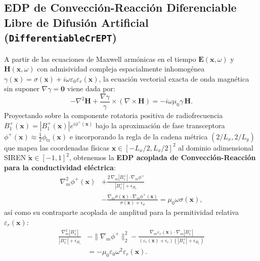 \documentclass[10pt,journal,compsoc]{IEEEtran}
\begin{document}
\subsection{EDP de Convección-Reacción Diferenciable Libre de Difusión Artificial (\texttt{DifferentiableCrEPT})}
A partir de las ecuaciones de Maxwell armónicas en el tiempo $\mathbf{E}(\mathbf{x},\omega)$ y $\mathbf{H}(\mathbf{x},\omega)$ con admisividad compleja espacialmente inhomogénea $\gamma(\mathbf{x}) = \sigma(\mathbf{x}) + i\omega\varepsilon_0\varepsilon_r(\mathbf{x})$, la ecuación vectorial exacta de onda magnética sin suponer $\nabla\gamma = \mathbf{0}$ viene dada por:
\begin{equation}
-\nabla^2 \mathbf{H} + \frac{\nabla\gamma}{\gamma} \times (\nabla \times \mathbf{H}) = -i\omega\mu_0\gamma\,\mathbf{H}.
\end{equation}
Proyectando sobre la componente rotatoria positiva de radiofrecuencia $B_1^+(\mathbf{x}) = |B_1^+(\mathbf{x})|e^{i\phi^+(\mathbf{x})}$ bajo la aproximación de fase transceptora $\phi^+(\mathbf{x}) \approx \frac{1}{2}\phi_{\text{tr}}(\mathbf{x})$ e incorporando la regla de la cadena métrica $(2/L_x, 2/L_y)$ que mapea las coordenadas físicas $\mathbf{x} \in [-L_x/2, L_x/2]^2$ al dominio adimensional SIREN $\tilde{\mathbf{x}} \in [-1, 1]^2$, obtenemos la \textbf{EDP acoplada de Convección-Reacción para la conductividad eléctrica}:
\begin{equation}
\begin{aligned}
\nabla_m^2 \phi^+(\mathbf{x}) &+ \frac{2\,\nabla_m |B_1^+| \cdot \nabla_m \phi^+}{|B_1^+| + \epsilon_{B_1}} \\
&- \frac{\nabla_m \sigma(\mathbf{x}) \cdot \nabla_m \phi^+(\mathbf{x})}{\sigma(\mathbf{x}) + \epsilon_\sigma} = \mu_0 \omega \sigma(\mathbf{x}),
\end{aligned}
\label{eq:cr_ept_phase}
\end{equation}
así como su contraparte acoplada de amplitud para la permitividad relativa $\varepsilon_r(\mathbf{x})$:
\begin{equation}
\begin{aligned}
\frac{\nabla_m^2 |B_1^+|}{|B_1^+| + \epsilon_{B_1}} &- \|\nabla_m \phi^+\|_2^2 - \frac{\nabla_m \varepsilon_r(\mathbf{x}) \cdot \nabla_m |B_1^+|}{(\varepsilon_r(\mathbf{x}) + \epsilon_\varepsilon)(|B_1^+| + \epsilon_{B_1})} \\
&= -\mu_0 \varepsilon_0 \omega^2 \varepsilon_r(\mathbf{x}).
\end{aligned}
\label{eq:cr_ept_amp}
\end{equation}
\end{document}
